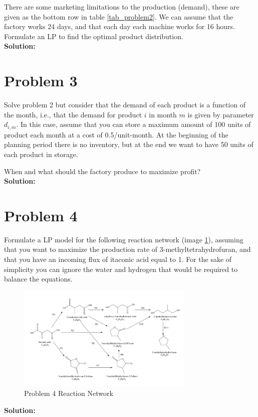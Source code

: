 \documentclass[11pt]{article}
\begin{document}
There are some marketing limitations to the production (demand), these are given as the bottom row in table \ref{tab_problem2}.
We can assume that the factory works 24 days, and that each day each machine works for
16 hours.
Formulate an LP to find the optimal product distribution.
\\
\textbf{Solution: }


\section{Problem 3}
Solve problem 2 but consider that the demand of each product is a function of
the month, i.e., that the demand for product $i$ in month $m$ is given by parameter $d_{i,m}$. In this
case, assume that you can store a maximum amount of 100 units of product each month at
a cost of 0.5/unit-month. At the beginning of the planning period there is no inventory, but at
the end we want to have 50 units of each product in storage.

When and what should the factory produce to maximize profit?
\\
\textbf{Solution: }

\section{Problem 4}
Formulate a LP model for the following reaction network (image \ref{fig:problem_4_rn}), assuming that you want
to maximize the production rate of 3-methyltetrahydrofuran, and that you have an incoming
flux of itaconic acid equal to 1. For the sake of simplicity you can ignore the water and
hydrogen that would be required to balance the equations.
\begin{figure}[htbp]
  \centerline{\includegraphics[width=0.75\textwidth]{images/image.png}}
  \caption{Problem 4 Reaction Network}
  \label{fig:problem_4_rn}
\end{figure}

\textbf{Solution: }
\end{document}
